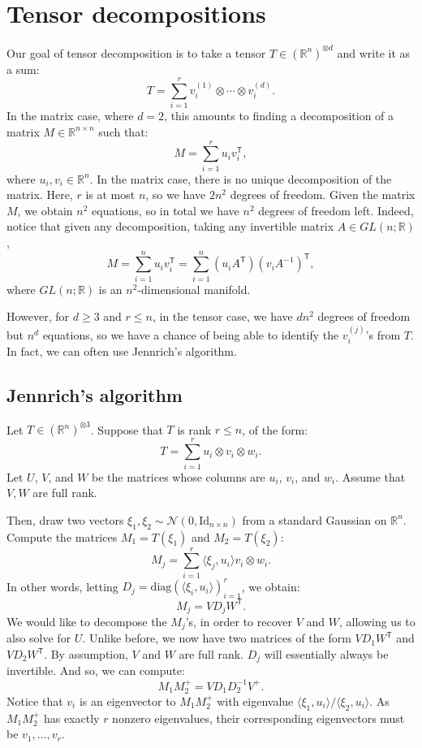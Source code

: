 \section{Tensor decompositions}
Our goal of tensor decomposition is to take a tensor $T \in (\mathbb{R}^n)^{\otimes d}$ and write it as a sum:
\[T = \sum_{i=1}^r v^{(1)}_i \otimes \dotsm \otimes v^{(d)}_i.\]
In the matrix case, where $d = 2$, this amounts to finding a decomposition of a matrix $M \in \mathbb{R}^{n \times n}$ such that:
\[M = \sum_{i=1}^r u_i v_i^\mathsf{T},\]
where $u_i, v_i \in \mathbb{R}^n$. In the matrix case, there is no unique decomposition of the matrix. Here, $r$ is at most $n$, so we have $2 n^2$ degrees of freedom. Given the matrix $M$, we obtain $n^2$ equations, so in total we have $n^2$ degrees of freedom left. Indeed, notice that given any decomposition, taking any invertible matrix $A \in GL(n;\mathbb{R})$,
\[M = \sum_{i=1}^n u_i v_i^\mathsf{T} = \sum_{i=1}^n (u_i A^\mathsf{T})(v_iA^{-1})^\mathsf{T},\]
where $GL(n;\mathbb{R})$ is an $n^2$-dimensional manifold.

However, for $d \geq 3$ and $r \leq n$, in the tensor case, we have $dn^2$ degrees of freedom but $n^d$ equations, so we have a chance of being able to identify the $v_i^{(j)}$'s from $T$. In fact, we can often use Jennrich's algorithm. 

\subsection{Jennrich's algorithm} Let $T \in (\mathbb{R}^n)^{\otimes 3}$. Suppose that $T$ is rank $r \leq n$, of the form:
\[T = \sum_{i=1}^r u_i \otimes v_i \otimes w_i.\]
Let $U$, $V$, and $W$ be the matrices whose columns are $u_i$, $v_i$, and $w_i$. Assume that $V,W$ are full rank.

Then, draw two vectors $\xi_1, \xi_2 \sim \mathcal{N}(0,\mathrm{Id}_{n\times n})$ from a standard Gaussian on $\mathbb{R}^n$. Compute the matrices $M_1 = T(\xi_1)$ and $M_2 = T(\xi_2)$:
\[M_j = \sum_{i=1}^r \langle \xi_j, u_i\rangle v_i \otimes w_i.\]
In other words, letting $D_j = \mathrm{diag}(\langle \xi_i , u_i\rangle)_{i=1}^r$, we obtain:
\[M_j = VD_jW^\mathsf{T}.\]
We would like to decompose the $M_j$'s, in order to recover $V$ and $W$, allowing us to also solve for $U$. Unlike before, we now have two matrices of the form $VD_1W^\mathsf{T}$ and $VD_2W^\mathsf{T}$. By assumption, $V$ and $W$ are full rank. $D_j$ will essentially always be invertible. And so, we can compute:
\[M_1M_2^+ = V D_1D_2^{-1} V^+.\]
Notice that $v_i$ is an eigenvector to $M_1M_2^+$ with eigenvalue $\langle \xi_1, u_i\rangle / \langle \xi_2, u_i\rangle$. As $M_1 M_2^+$ has exactly $r$ nonzero eigenvalues, their corresponding eigenvectors must be $v_1,\dotsc, v_r$.

